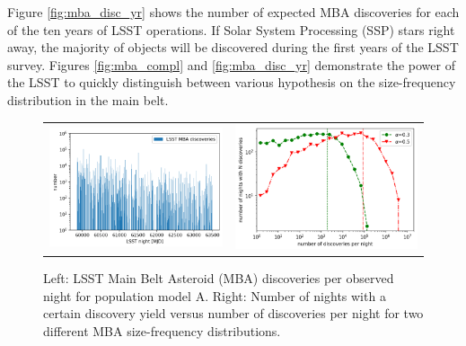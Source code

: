 Figure \ref{fig:mba_disc_yr} shows the number of expected MBA discoveries for each of the ten years of \gls{LSST} operations. If Solar System Processing (\gls{SSP}) stars right away, the majority of objects will be discovered during the first years of the \gls{LSST} survey. Figures \ref{fig:mba_compl} and \ref{fig:mba_disc_yr} demonstrate the power of the \gls{LSST} to quickly distinguish between various hypothesis on the size-frequency distribution in the main belt. 
%
\begin{figure}[tb!]
\begin{center}
\begin{tabular}{cc}
\includegraphics[width=0.5\linewidth]{figs/disc_per_night.png} &
\includegraphics[width=0.50\linewidth]{figs/disc_stat.png}
\end{tabular}
\end{center}
\caption{Left: \gls{LSST} Main Belt Asteroid (MBA) discoveries per observed night for population model A. Right: Number of nights with a certain discovery yield versus number of discoveries per night for two different MBA size-frequency distributions.}
\label{fig:mba_disc_stats}       %
\end{figure}

